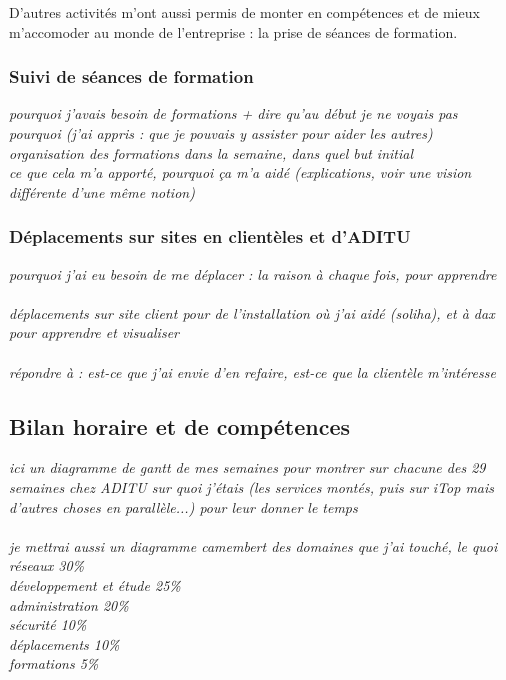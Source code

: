 \begin{sloppypar}
D'autres activités m'ont aussi permis de monter en compétences et de mieux m'accomoder au monde de l'entreprise : la prise de séances de formation.

\subsubsection{Suivi de séances de formation}

\textit{pourquoi j'avais besoin de formations + dire qu'au début je ne voyais pas pourquoi (j'ai appris : que je pouvais y assister pour aider les autres)}
\\
\textit{organisation des formations dans la semaine, dans quel but initial}
\\
\textit{ce que cela m'a apporté, pourquoi ça m'a aidé (explications, voir une vision différente d'une même notion)}

\subsubsection{Déplacements sur sites en clientèles et d'ADITU}

\textit{pourquoi j'ai eu besoin de me déplacer : la raison à chaque fois, pour apprendre}
\\ \\
\textit{déplacements sur site client pour de l'installation où j'ai aidé (soliha), et à dax pour apprendre et visualiser}
\\ \\
\textit{répondre à : est-ce que j'ai envie d'en refaire, est-ce que la clientèle m'intéresse}

\subsection{Bilan horaire et de compétences}

\textit{ici un diagramme de gantt de mes semaines pour montrer sur chacune des 29 semaines chez ADITU sur quoi j'étais (les services montés, puis sur iTop mais d'autres choses en parallèle...) pour leur donner le temps}
\\ \\
\textit{je mettrai aussi un diagramme camembert des domaines que j'ai touché, le quoi\\
réseaux 30\%
\\
développement et étude 25\%
\\
administration 20\%
\\
sécurité 10\%
\\
déplacements 10\%
\\
formations 5\%}


\end{sloppypar}
